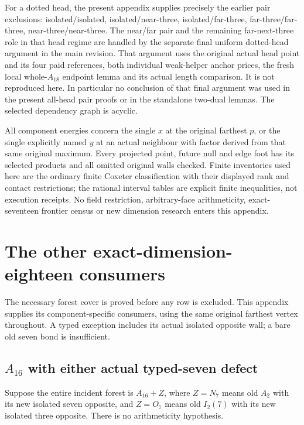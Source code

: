 \documentclass[11pt]{article}
\theoremstyle{definition}
\theoremstyle{remark}
\begin{document}
For a dotted head, the present appendix supplies precisely the
earlier pair exclusions: isolated/isolated, isolated/near-three,
isolated/far-three, far-three/far-three, near-three/near-three.
The near/far pair and the remaining far-next-three role in that
head regime are handled by the separate final uniform dotted-head
argument in the main revision.
That argument uses the original actual head point and its four
paid references, both individual weak-helper anchor prices, the
fresh local whole-\(A_{18}\) endpoint lemma and its actual length
comparison.  It is not reproduced here.
In particular no conclusion of that final argument was used in
the present all-head pair proofs or in the standalone two-dual
lemmas.  The selected dependency graph is acyclic.

All component energies concern the single \(x\) at the original
farthest \(p\), or the single explicitly named \(y\) at an actual
neighbour with factor derived from that same original maximum.
Every projected point, future null and edge foot has its selected
products and all omitted original walls checked.
Finite inventories used here are the ordinary finite Coxeter
classification with their displayed rank and contact restrictions;
the rational interval tables are explicit finite inequalities,
not execution receipts.  No field restriction, arbitrary-face
arithmeticity, exact-seventeen frontier census or new dimension
research enters this appendix.

\section{The other exact-dimension-eighteen consumers}
\label{app:otherexact18}
The necessary forest cover is proved before any row is excluded.
This appendix supplies its component-specific consumers, using the same
original farthest vertex throughout.  A typed exception includes its
actual isolated opposite wall; a bare old seven bond is insufficient.

\subsection[A16 with either actual typed-seven defect]{\(A_{16}\) with either actual typed-seven defect}
\label{app:A16typed18}
Suppose the entire incident forest is \(A_{16}+Z\), where
\(Z=N_7\) means old \(A_2\) with its new isolated seven opposite,
and \(Z=O_7\) means old \(I_2(7)\) with its new isolated three
opposite.  There is no arithmeticity hypothesis.
\end{document}
